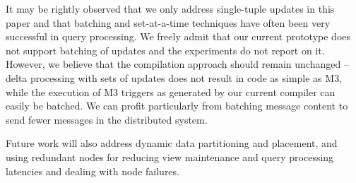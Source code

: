 \documentclass{sig-alternate}
\begin{document}
It may be rightly observed that we only address single-tuple updates
in this paper and that batching and set-at-a-time techniques have often been
very successful in query processing. We freely admit that our current prototype
does not support batching of updates and the experiments do not report on it.
However, we believe that the compilation approach
should remain unchanged -- delta processing with sets of updates does not
result in code as simple as M3, while the
execution of M3 triggers as generated by our current compiler
can easily be batched. We can profit
particularly from batching message content to send fewer messages in the
distributed system. 

Future work will also address dynamic data partitioning and placement,
and using redundant nodes for reducing view maintenance and query processing
latencies and dealing with node failures.







\end{document}
